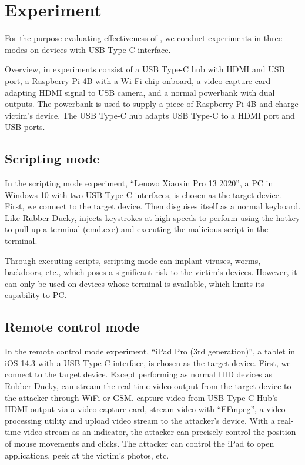 \section{Experiment}
\label{sec:experiment}

For the purpose evaluating effectiveness of \tool, we conduct experiments in three modes on devices with USB Type-C interface.

Overview, \tool in experiments consist of a USB Type-C hub with HDMI and USB port,
a Raspberry Pi 4B with a Wi-Fi chip onboard,
a video capture card adapting HDMI signal to USB camera,
and a normal powerbank with dual outputs.
The powerbank is used to supply a piece of Raspberry Pi 4B and charge victim's device.
The USB Type-C hub adapts USB Type-C to a HDMI port and USB ports.


\subsection{Scripting mode}

In the scripting mode experiment, ``Lenovo Xiaoxin Pro 13 2020'', a PC in Windows 10 with two USB Type-C interfaces, is chosen as the target device. First, we connect \tool to the target device. Then \tool disguises itself as a normal keyboard. Like Rubber Ducky, \tool injects keystrokes at high speeds to perform using the hotkey to pull up a terminal (cmd.exe) and executing the malicious script in the terminal.

Through executing scripts, scripting mode can implant viruses, worms, backdoors, etc., which poses a significant risk to the victim's devices.
However, it can only be used on devices whose terminal is available, which limits its capability to PC.

\subsection{Remote control mode}

In the remote control mode experiment, ``iPad Pro (3rd generation)'', a tablet in iOS 14.3 with a USB Type-C interface, is chosen as the target device. First, we connect \tool to the target device.
Except performing as normal HID devices as Rubber Ducky, \tool can stream the real-time video output from the target device to the attacker through WiFi or GSM.
\tool capture video from USB Type-C Hub's HDMI output via a video capture card, stream video with ``FFmpeg'', a video processing utility and upload video stream to the attacker's device.
With a real-time video stream as an indicator, the attacker can precisely control the position of mouse movements and clicks. The attacker can control the iPad to open applications, peek at the victim's photos, etc.

